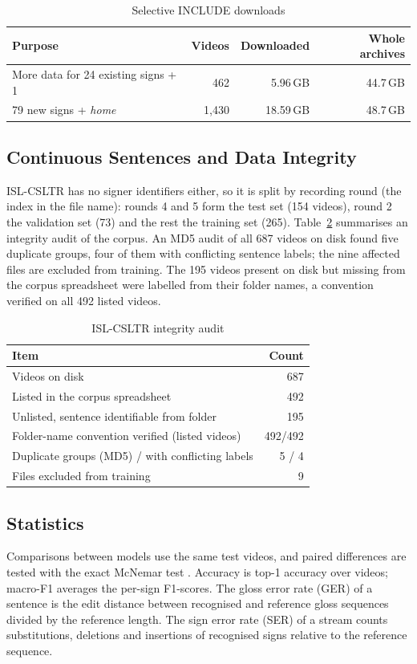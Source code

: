 \documentclass[conference]{IEEEtran}
\begin{document}
\begin{table}[t]
\caption{Selective INCLUDE downloads}
\label{tab:download}
\centering
\begin{tabular}{@{}lrrr@{}}
\toprule
Purpose & Videos & Downloaded & Whole archives \\
\midrule
More data for 24 existing signs + 1 & 462 & 5.96\,GB & 44.7\,GB \\
79 new signs + \textit{home} & 1{,}430 & 18.59\,GB & 48.7\,GB \\
\bottomrule
\end{tabular}
\end{table}

\subsection{Continuous Sentences and Data Integrity}
ISL-CSLTR has no signer identifiers either, so it is split by recording round (the index in the file name): rounds 4 and 5 form the test set (154 videos), round 2 the validation set (73) and the rest the training set (265). Table~\ref{tab:integrity} summarises an integrity audit of the corpus. An MD5 audit of all 687 videos on disk found five duplicate groups, four of them with conflicting sentence labels; the nine affected files are excluded from training. The 195 videos present on disk but missing from the corpus spreadsheet were labelled from their folder names, a convention verified on all 492 listed videos.

\begin{table}[t]
\caption{ISL-CSLTR integrity audit}
\label{tab:integrity}
\centering
\begin{tabular}{@{}lr@{}}
\toprule
Item & Count \\
\midrule
Videos on disk & 687 \\
Listed in the corpus spreadsheet & 492 \\
Unlisted, sentence identifiable from folder & 195 \\
Folder-name convention verified (listed videos) & 492/492 \\
Duplicate groups (MD5) / with conflicting labels & 5 / 4 \\
Files excluded from training & 9 \\
\bottomrule
\end{tabular}
\end{table}

\subsection{Statistics}
Comparisons between models use the same test videos, and paired differences are tested with the exact McNemar test \cite{mcnemar1947}. Accuracy is top-1 accuracy over videos; macro-F1 averages the per-sign F1-scores. The gloss error rate (GER) of a sentence is the edit distance between recognised and reference gloss sequences divided by the reference length. The sign error rate (SER) of a stream counts substitutions, deletions and insertions of recognised signs relative to the reference sequence.
\end{document}
